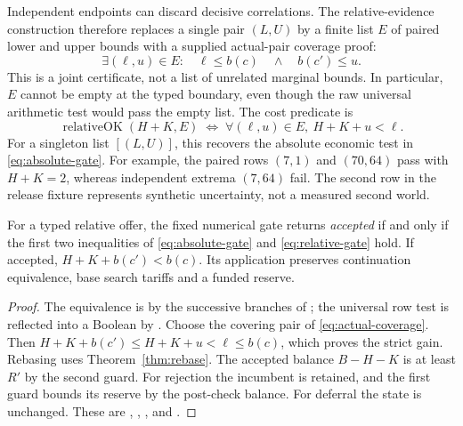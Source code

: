 Independent endpoints can discard decisive correlations. The relative-evidence construction therefore replaces a single pair $(L,U)$ by a finite list $E$ of paired lower and upper bounds with a supplied actual-pair coverage proof:
\begin{equation}\label{eq:actual-coverage}
 \exists (\ell,u)\in E:\quad \ell\le b(c)\quad\land\quad b(c')\le u.
\end{equation}
This is a joint certificate, not a list of unrelated marginal bounds. In particular, $E$ cannot be empty at the typed boundary, even though the raw universal arithmetic test would pass the empty list. The cost predicate is
\begin{equation}\label{eq:relative-gate}
 \operatorname{relativeOK}(H+K,E)\;\Longleftrightarrow\;
 \forall(\ell,u)\in E,\ H+K+u<\ell.
\end{equation}
For a singleton list $[(L,U)]$, this recovers the absolute economic test in \eqref{eq:absolute-gate}. For example, the paired rows $(7,1)$ and $(70,64)$ pass with $H+K=2$, whereas independent extrema $(7,64)$ fail. The second row in the release fixture represents synthetic uncertainty, not a measured second world.

\begin{theorem}\label{thm:gate}
For a typed relative offer, the fixed numerical gate returns \emph{accepted} if and only if the first two inequalities of \eqref{eq:absolute-gate} and \eqref{eq:relative-gate} hold. If accepted, $H+K+b(c')<b(c)$. Its application preserves continuation equivalence, base search tariffs and a funded reserve.
\end{theorem}
\begin{proof}
The equivalence is by the successive branches of ; the universal row test is reflected into a Boolean by . Choose the covering pair of \eqref{eq:actual-coverage}. Then $H+K+b(c')\le H+K+u<\ell\le b(c)$, which proves the strict gain. Rebasing uses Theorem~\ref{thm:rebase}. The accepted balance $B-H-K$ is at least $R'$ by the second guard. For rejection the incumbent is retained, and the first guard bounds its reserve by the post-check balance. For deferral the state is unchanged. These are , , , and .
\end{proof}

